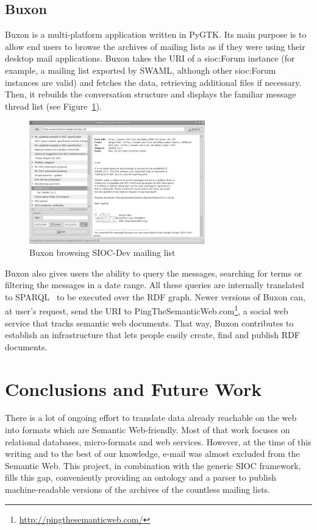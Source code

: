 \documentclass{llncs}
\begin{document}
\subsection{Buxon}

Buxon is a multi-platform application written in PyGTK. Its main purpose
is to allow end users to browse the archives of mailing lists as if
they were using their desktop mail applications. Buxon takes
the URI of a \textsf{sioc:Forum} instance (for example, a mailing list
exported by SWAML, although other \textsf{sioc:Forum} instances
are valid) and fetches the data, retrieving additional files
if necessary. Then, it rebuilds the conversation structure and
displays the familiar message thread list (see Figure~\ref{fig:buxon}).

\begin{figure}[ht]
 \centering
 \includegraphics[bb=0 0 288 202]{images/buxon.png}
 \caption{\label{fig:buxon}Buxon browsing SIOC-Dev mailing list}
\end{figure}

Buxon also gives users the ability to query the messages, searching
for terms or filtering the messages in a date range. All these queries
are internally translated to SPARQL~\cite{SPARQLProtocol} to be executed
over the RDF graph. Newer versions of Buxon can, at user's
request, send the URI to
PingTheSemanticWeb.com\footnote{\url{http://pingthesemanticweb.com/}}, 
a social web service that tracks semantic web documents.
That way, Buxon
contributes to establish an infrastructure that lets people easily create, 
find and publish RDF documents.

\section{\label{sec:conclusions}Conclusions and Future Work}

There is a lot of ongoing effort to translate data already reachable
on the web into formats which are Semantic Web-friendly. Most of that 
work focuses on relational databases, micro-formats and web services. 
However, at the time of this writing and to the best of our knowledge, 
e-mail was almost excluded from the Semantic Web. This project, in 
combination with the generic SIOC framework, fills this gap, conveniently 
providing an ontology and a parser to publish machine-readable versions 
of the archives of the countless mailing lists.
\end{document}
